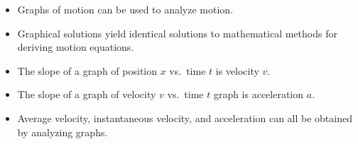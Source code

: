 \documentclass[
]{book}
\providecommand{\tightlist}{%
  \setlength{\itemsep}{0pt}\setlength{\parskip}{0pt}}
\begin{document}
\begin{itemize}
\tightlist
\item
  \protect\hypertarget{import-auto-id2388505}{}{Graphs of motion can be used to analyze
  motion.}
\item
  \protect\hypertarget{import-auto-id4097898}{}{Graphical solutions yield identical solutions to mathematical
  methods for deriving motion equations.}
\item
  \protect\hypertarget{import-auto-id2294483}{}{The slope of a graph of position \(x{}\) vs.~time \(t{}\) is velocity
  \(v{}\).}
\item
  \protect\hypertarget{import-auto-id2025741}{}{The slope of a graph of velocity
  \(v{}\)\emph{} vs.~time \(t{}\) graph is
  acceleration \(a{}\).}
\item
  \protect\hypertarget{import-auto-id1561758}{}{Average velocity, instantaneous velocity, and acceleration can all
  be obtained by analyzing graphs.}
\end{itemize}
\end{document}
